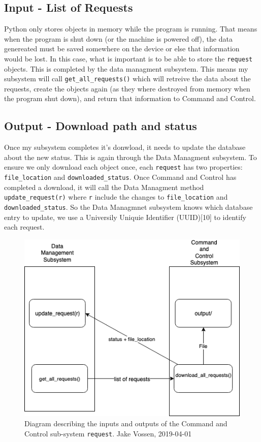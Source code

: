 \documentclass{article}
\begin{document}
\subsection{Input - List of Requests}

Python only stores objects in memory while the program is
running. That means when the program is shut down (or the machine is
powered off), the data genereated must be saved somewhere on the
device or else that information would be lost. In this case, what is
important is to be able to store the \texttt{request} objects. This is
completed by the data managment subsystem. This means my subsystem
will call \texttt{get\_all\_requests()} which will retreive the data
about the requests, create the objects again (as they where destroyed
from memory when the program shut down), and return that information
to Command and Control.

\subsection{Output - Download path and status}

Once my subsystem completes it's donwload, it needs to update the
database about the new status. This is again through the Data
Managment subsystem. To ensure we only download each object once, each
\texttt{request} has two properties: \texttt{file\_location} and
\texttt{downloaded\_status}. Once Command and Control has completed a
download, it will call the Data Managment method
\texttt{update\_request(r)} where \texttt{r} include the changes to
\texttt{file\_location} and \texttt{downloaded\_status}. So the
Data Managmnet subsystem knows which database entry to update, we use
a Universily Uniquie Identifier (UUID)[10] to identify each
request.

\begin{figure}[h]
  \centering
  \includegraphics[scale=.5]{input-output.png}
  \caption{\begingroup \fontsize{10pt}{12pt}\selectfont Diagram
    describing the inputs and outputs of the Command and Control sub-system
    \texttt{request}. Jake Vossen, 2019-04-01 \endgroup}
\end{figure}
\end{document}
